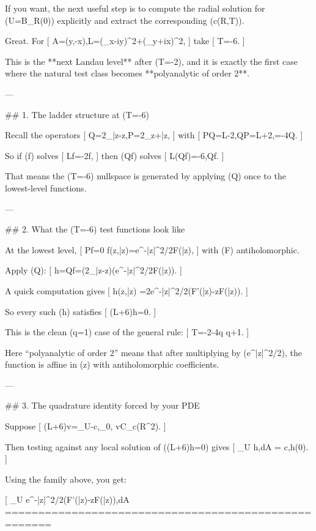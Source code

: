 If you want, the next useful step is to compute the radial solution for (U=B_R(0)) explicitly and extract the corresponding (c(R,T)).



Great. For
[
A=(y,-x),\qquad L=(\partial_x-iy)^2+(\partial_y+ix)^2,
]
take
[
T=-6.
]

This is the **next Landau level** after (T=-2), and it is exactly the first case where the natural test class becomes **polyanalytic of order 2**.

---

## 1. The ladder structure at (T=-6)

Recall the operators
[
Q=2\partial_{\bar z}-z,\qquad P=2\partial_z+\bar z,
]
with
[
PQ=L-2,\qquad QP=L+2,\qquad [L,Q]=-4Q.
]

So if (f) solves
[
Lf=-2f,
]
then (Qf) solves
[
L(Qf)=-6,Qf.
]

That means the (T=-6) nullspace is generated by applying (Q) once to the lowest-level functions.

---

## 2. What the (T=-6) test functions look like

At the lowest level,
[
Pf=0
\quad\Longleftrightarrow\quad
f(z,\bar z)=e^{-|z|^2/2}F(\bar z),
]
with (F) antiholomorphic.

Apply (Q):
[
h=Qf=(2\partial_{\bar z}-z)\big(e^{-|z|^2/2}F(\bar z)\big).
]

A quick computation gives
[
h(z,\bar z)
=2e^{-|z|^2/2}\Big(F'(\bar z)-zF(\bar z)\Big).
]

So every such (h) satisfies
[
(L+6)h=0.
]

This is the clean (q=1) case of the general rule:
[
T=-2-4q
\quad\Longleftrightarrow\quad
{}q+1.
]

Here “polyanalytic of order 2” means that after multiplying by (e^{|z|^2/2}), the function is affine in (z) with antiholomorphic coefficients.

---

## 3. The quadrature identity forced by your PDE

Suppose
[
(L+6)v=_U-c,\delta_0,
\qquad v\in C_c(\mathbb R^2).
]

Then testing against any local solution of ((L+6)h=0) gives
[
\int_U h,dA = c,h(0).
]

Using the family above, you get:

[
\int_U e^{-|z|^2/2}\Big(F'(\bar z)-zF(\bar z)\Big),dA
=====================================================

